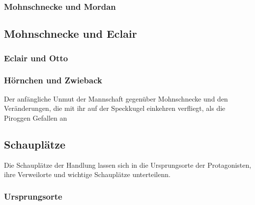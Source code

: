 \subsubsection {Mohnschnecke und Mordan}
\subsection{Mohnschnecke und Eclair}
\subsubsection {Eclair und Otto}
\subsubsection{Hörnchen und Zwieback}
Der anfängliche Unmut der Mannschaft gegenüber Mohnschnecke und den Veränderungen, die mit ihr auf der 
Speckkugel einkehren \cite[S. 77 f]{pir} verfliegt, als die Piroggen Gefallen an 

\subsection{Schauplätze}
Die Schauplätze der Handlung lassen sich in die Ursprungsorte der Protagonisten, ihre Verweilorte und wichtige Schauplätze unterteilenn.

\subsubsection{Ursprungsorte}

